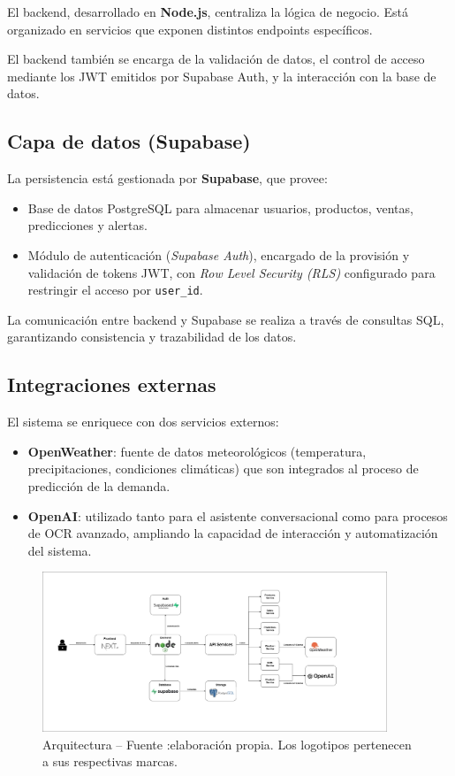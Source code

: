 El backend, desarrollado en \textbf{Node.js}, centraliza la lógica de negocio. 
Está organizado en servicios que exponen distintos endpoints específicos.

El backend también se encarga de la validación de datos, el control 
de acceso mediante los JWT emitidos por Supabase Auth, y la interacción 
con la base de datos.

\subsection{Capa de datos (Supabase)}

La persistencia está gestionada por \textbf{Supabase}, que provee:
\begin{itemize}
    \item Base de datos PostgreSQL para almacenar usuarios, productos, ventas, predicciones y alertas.
    \item Módulo de autenticación (\textit{Supabase Auth}), encargado de la provisión y validación de tokens JWT, con \textit{Row Level Security (RLS)} configurado para restringir el acceso por \texttt{user\_id}.
\end{itemize}

La comunicación entre backend y Supabase se realiza a través de 
consultas SQL, garantizando consistencia y trazabilidad de los datos.

\subsection{Integraciones externas}

El sistema se enriquece con dos servicios externos:
\begin{itemize}
    \item \textbf{OpenWeather}: fuente de datos meteorológicos (temperatura, precipitaciones, condiciones climáticas) que son integrados al proceso de predicción de la demanda.
    \item \textbf{OpenAI}: utilizado tanto para el asistente conversacional como para procesos de OCR avanzado, ampliando la capacidad de interacción y automatización del sistema.
\end{itemize}


\begin{figure}[!htbp]
  \centering
  \includegraphics[width=0.92\textwidth]{images/arquitecturaAIVA.png} %
  \caption{Arquitectura -- Fuente :elaboración propia. Los logotipos pertenecen a sus respectivas marcas.}
  \label{fig:arquitectura-aiva}
\end{figure}
\vspace{1cm}

